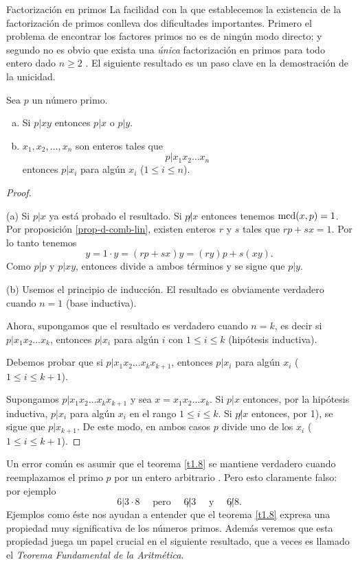 \begin{section}{Factorización en primos}
La facilidad con la que establecemos la existencia de la
factorización de primos conlleva dos dificultades importantes.
Primero el problema de encontrar los factores primos no es de
ningún modo directo; y segundo no es obvio que exista una {\it
única} factorización en primos para todo entero dado $n\ge 2$ . El
siguiente resultado es un paso clave en la demostración de la
unicidad.

\begin{teorema}\label{t1.8} Sea $p$  un número  primo.

\begin{enumerate}[a)] 
\item Si $p|xy$ entonces $p|x$ o $p|y$.
\item $x_1,x_2,\ldots,x_n$ son enteros tales que
$$
p|x_1x_2\ldots x_n
$$
entonces $p|x_i$ para algún $x_i$ ($1\le i \le n$).
\end{enumerate}
\end{teorema}
\begin{proof}
\

\noindent(a)  Si $p|x$ ya está probado el resultado. Si $p{{\not|}}x$ entonces tenemos $\operatorname{mcd}(x,p)=1$. Por proposición \ref{prop-d-comb-lin}, existen enteros $r$ y $s$ tales que $rp+sx=1$. Por lo
tanto tenemos 
$$
y = 1 \cdot y = (rp+sx)y =(ry)p+s(xy).
$$
Como $p|p$ y $p|xy$, entonces divide a ambos términos y se sigue que $p|y$. 

\noindent(b) Usemos el principio de inducción. El resultado
es obviamente verdadero cuando $n=1$ (base inductiva). 

Ahora, supongamos que el resultado es verdadero cuando $n=k$, es decir si $p|x_1x_2\ldots x_k$, entonces 
$p|x_i$ para algún $i$ con $1\le i \le k$ (hipótesis inductiva).

Debemos probar que si $p|x_1x_2\ldots x_{k}x_{k+1}$, entonces  $p|x_i$ para algún $x_i$ ($1\le i \le k+1$).

Supongamos $p|x_1x_2\ldots x_{k}x_{k+1}$ y sea $x=x_1x_2\ldots x_k$. Si $p|x$
entonces, por la hipótesis inductiva, $p|x_i$ para algún $x_i$ en
el rango $1\le i \le k$. Si $p{{\not|}}x$ entonces, por 1), se sigue que $p|x_{k+1}$. De
este modo, en ambos casos $p$ divide uno de los $x_i$ ($1\le i\le
k+1$). 
\end{proof}

Un error común es asumir que el teorema \ref{t1.8} se mantiene
verdadero cuando reemplazamos el primo $p$ por un entero
arbitrario . Pero esto claramente falso: por ejemplo
$$
6| 3\cdot 8 \quad \text{ pero } \quad 6{\not|} 3 \quad \text{ y }
\quad 6{\not|}8.
$$
Ejemplos como éste nos ayudan a entender que el teorema \ref{t1.8}
expresa una propiedad muy significativa de los números primos.
Además veremos que esta propiedad juega un papel crucial en el
siguiente resultado, que a veces es llamado el {\it Teorema
Fundamental de la Aritmética}.


\end{section}
